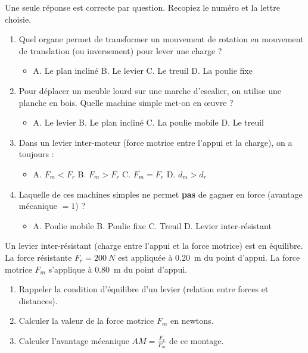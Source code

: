 \documentclass[11pt]{article}
\begin{document}
\begin{exercice}
Une seule réponse est correcte par question. Recopiez le numéro et la lettre choisie.
\begin{enumerate}
    \item Quel organe permet de transformer un mouvement de rotation en mouvement de translation (ou inversement) pour lever une charge ?
    \begin{itemize}
        \item A. Le plan incliné \quad B. Le levier \quad C. Le treuil \quad D. La poulie fixe
    \end{itemize}
    \item Pour déplacer un meuble lourd sur une marche d'escalier, on utilise une planche en bois. Quelle machine simple met-on en œuvre ?
    \begin{itemize}
        \item A. Le levier \quad B. Le plan incliné \quad C. La poulie mobile \quad D. Le treuil
    \end{itemize}
    \item Dans un levier inter-moteur (force motrice entre l'appui et la charge), on a toujours :
    \begin{itemize}
        \item A. $F_m < F_r$ \quad B. $F_m > F_r$ \quad C. $F_m = F_r$ \quad D. $d_m > d_r$
    \end{itemize}
    \item Laquelle de ces machines simples ne permet \textbf{pas} de gagner en force (avantage mécanique $=1$) ?
    \begin{itemize}
        \item A. Poulie mobile \quad B. Poulie fixe \quad C. Treuil \quad D. Levier inter-résistant
    \end{itemize}
\end{enumerate}
\end{exercice}

\begin{exercice}
Un levier inter-résistant (charge entre l'appui et la force motrice) est en équilibre. La force résistante $F_r = \SI{200}{N}$ est appliquée à \SI{0,20}{m} du point d'appui. La force motrice $F_m$ s'applique à \SI{0,80}{m} du point d'appui.
\begin{enumerate}
    \item Rappeler la condition d'équilibre d'un levier (relation entre forces et distances).
    \item Calculer la valeur de la force motrice $F_m$ en newtons.
    \item Calculer l'avantage mécanique $AM = \frac{F_r}{F_m}$ de ce montage.
\end{enumerate}
\end{exercice}
\end{document}
